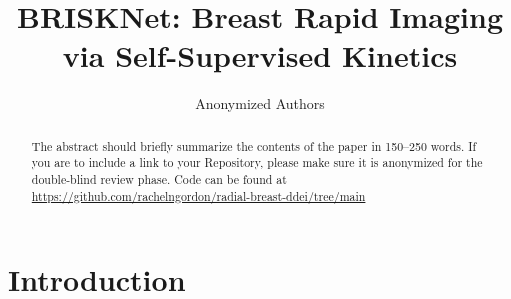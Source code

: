\documentclass[runningheads]{llncs}
\begin{document}
%
\title{BRISKNet: Breast Rapid Imaging via Self-Supervised Kinetics}
%

\author{Anonymized Authors}  %
  
\maketitle              %
%
\begin{abstract}
The abstract should briefly summarize the contents of the paper in 150--250 words.  If you are to include a link to your Repository, please make sure it is anonymized for the double-blind review phase.
Code can be found at \url{https://github.com/rachelngordon/radial-breast-ddei/tree/main}


\end{abstract}


\section{Introduction}
\end{document}
